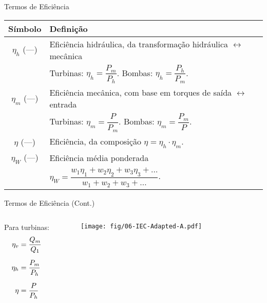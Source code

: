     \begin{frame}{Termos de Eficiência}\vspace*{-1em}
        \setlength{\tabcolsep}{2mm}
        \noindent\begin{longtable}{cp{110mm}}
            \alert{Símbolo} & \alert{Definição} \\
            \hline
            $\eta_h$ (---) &
            Eficiência hidráulica, da transformação hidráulica $\leftrightarrow$ mecânica \\
            & Turbinas: \alert{$\eta_h = \dfrac{P_m}{P_h}$}.
              Bombas:   \alert{$\eta_h = \dfrac{P_h}{P_m}$}. \\
            $\eta_m$ (---) &
            Eficiência mecânica, com base em torques de saída $\leftrightarrow$ entrada \\
            & Turbinas: \alert{$\eta_m = \dfrac{P}{P_m}$}.
              Bombas:   \alert{$\eta_m = \dfrac{P_m}{P}$}. \\
            $\eta$ (---) &
            Eficiência, da composição \alert{$\eta = \eta_h\cdot\eta_m$}. \\
            $\eta_W$ (---) &
            Eficiência média ponderada \\
            & \alert{$\eta_W = \dfrac{w_1\eta_1 + w_2\eta_2 + w_3\eta_3 + \ldots}{w_1 + w_2 +
            w_3 + \ldots}$}. \\
            \hline
        \end{longtable}
    \end{frame}

    \begin{frame}{Termos de Eficiência (Cont.)}\vspace*{-1em}
        \begin{columns}
            Para turbinas:
            \begin{align*}
                \eta_v &= \dfrac{Q_m}{Q_1} \\[\medskipamount]
                \eta_h &= \dfrac{P_m}{P_h} \\[\medskipamount]
                \eta &= \dfrac{P}{P_h}
            \end{align*}
            \begin{center}
                \begin{figure}
                    \texttt{[image: fig/06-IEC-Adapted-A.pdf]}
                \end{figure}
            \end{center}
        \end{columns}
    \end{frame}


